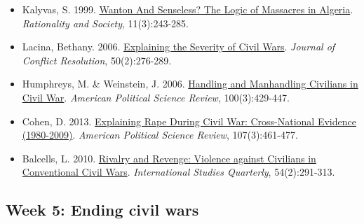 \documentclass[12pt,]{article}
\providecommand{\tightlist}{%
  \setlength{\itemsep}{0pt}\setlength{\parskip}{0pt}}
\begin{document}
\begin{itemize}
\tightlist
\item
  Kalyvas, S. 1999.
  \href{http://journals.sagepub.com/doi/abs/10.1177/104346399011003001}{Wanton
  And Senseless? The Logic of Massacres in Algeria}. \emph{Rationality
  and Society}, 11(3):243-285.
\item
  Lacina, Bethany. 2006.
  \href{http://journals.sagepub.com/doi/abs/10.1177/0022002705284828}{Explaining
  the Severity of Civil Wars}. \emph{Journal of Conflict Resolution},
  50(2):276-289.
\item
  Humphreys, M. \& Weinstein, J. 2006.
  \href{https://www.cambridge.org/core/journals/american-political-science-review/article/handling-and-manhandling-civilians-in-civil-war/4981647EDFE411635EB2086C4A851BFA}{Handling
  and Manhandling Civilians in Civil War}. \emph{American Political
  Science Review}, 100(3):429-447.
\item
  Cohen, D. 2013.
  \href{https://www.cambridge.org/core/journals/american-political-science-review/article/explaining-rape-during-civil-war-crossnational-evidence-19802009/30FC323D6DA7E923547156CC0E947213}{Explaining
  Rape During Civil War: Cross-National Evidence (1980-2009)}.
  \emph{American Political Science Review}, 107(3):461-477.
\item
  Balcells, L. 2010.
  \href{https://academic.oup.com/isq/article-abstract/54/2/291/1793034}{Rivalry
  and Revenge: Violence against Civilians in Conventional Civil Wars}.
  \emph{International Studies Quarterly}, 54(2):291-313.
\end{itemize}

\hypertarget{week-5-ending-civil-wars}{%
\subsection{Week 5: Ending civil wars}\label{week-5-ending-civil-wars}}
\end{document}
